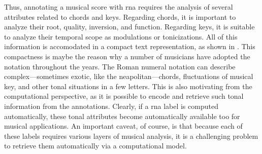 Thus, annotating a musical score with \gls{rna} requires the
analysis of several attributes related to chords and keys.
Regarding chords, it is important to analyze their root,
quality, inversion, and function. Regarding keys, it is
suitable to analyze their temporal scope as modulations or
tonicizations. All of this information is accomodated in a
compact text representation, as shown in
. This compactness is maybe
the reason why a number of musicians have adopted the
notation throughout the years. The Roman numeral notation
can describe complex---sometimes exotic, like the
\gls{neapolitan}---chords, fluctuations of musical key, and
other tonal situations in a few letters. This is also
motivating from the computational perspective, as it is
possible to encode and retrieve such tonal information from
the annotations. Clearly, if a \gls{rna} label is computed
automatically, these tonal attributes become automatically
available too for musical applications. An important caveat,
of course, is that because each of these labels requires
various layers of musical analysis, it is a challenging
problem to retrieve them automatically via a computational
model.






